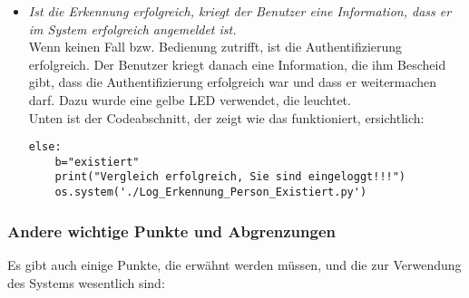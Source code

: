 \begin{enumerate}
\begin{itemize}
\begin{enumerate}
	\end{enumerate}
\item \textit{Ist die Erkennung erfolgreich, kriegt der Benutzer eine Information, dass er im System erfolgreich angemeldet ist.} \\

Wenn keinen Fall bzw. Bedienung zutrifft, ist die Authentifizierung erfolgreich. Der Benutzer kriegt danach eine Information, die ihm Bescheid gibt, dass die Authentifizierung erfolgreich war und dass er weitermachen darf. Dazu wurde eine gelbe LED verwendet, die leuchtet. \\	

Unten ist der Codeabschnitt, der zeigt wie das funktioniert, ersichtlich:\\

\begin{lstlisting}
else:
	b="existiert"
	print("Vergleich erfolgreich, Sie sind eingeloggt!!!")
	os.system('./Log_Erkennung_Person_Existiert.py')
\end{lstlisting}

\end{itemize}
\end{enumerate}
\subsubsection{Andere wichtige Punkte und Abgrenzungen}

Es gibt auch einige Punkte, die erwähnt werden müssen, und die zur Verwendung des Systems wesentlich sind:

